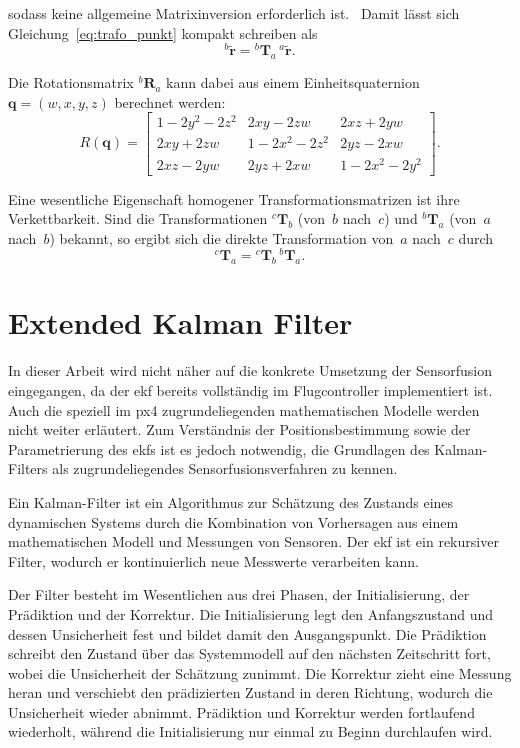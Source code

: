 sodass keine allgemeine Matrixinversion erforderlich ist.~\cite{Lynch2017}
Damit lässt sich Gleichung~\ref{eq:trafo_punkt} kompakt schreiben als
\begin{equation}
^b\tilde{\mathbf{r}} = {^b\mathbf{T}_a}\,{^a\tilde{\mathbf{r}}}.
\label{eq:trafo_homogen}
\end{equation}

Die Rotationsmatrix $^b\mathbf{R}_a$ kann dabei aus einem Einheitsquaternion $\mathbf{q} = (w, x, y, z)$ berechnet werden:
\begin{equation}
R(\mathbf{q}) = 
\begin{bmatrix}
1 - 2y^2 - 2z^2 & 2xy - 2zw & 2xz + 2yw \\
2xy + 2zw & 1 - 2x^2 - 2z^2 & 2yz - 2xw \\
2xz - 2yw & 2yz + 2xw & 1 - 2x^2 - 2y^2
\end{bmatrix}.
\label{eq:rotationsmatrix_quaternion}
\end{equation}

Eine wesentliche Eigenschaft homogener Transformationsmatrizen ist ihre Verkettbarkeit.
Sind die Transformationen $^c\mathbf{T}_b$ (von~$b$ nach~$c$) und $^b\mathbf{T}_a$ (von~$a$ nach~$b$) bekannt, so ergibt sich die direkte Transformation von~$a$ nach~$c$ durch
\begin{equation}
^c\mathbf{T}_a = {^c\mathbf{T}_b}\,{^b\mathbf{T}_a}.
\label{eq:trafo_verkettung}
\end{equation}

\section{Extended Kalman Filter}
\label{sec:ekf}
In dieser Arbeit wird nicht näher auf die konkrete Umsetzung der Sensorfusion eingegangen, da der \gls{ekf} bereits vollständig im Flugcontroller implementiert ist.
Auch die speziell im \gls{px4} zugrundeliegenden mathematischen Modelle werden nicht weiter erläutert.
Zum Verständnis der Positionsbestimmung sowie der Parametrierung des \gls{ekf}s ist es jedoch notwendig, die Grundlagen des Kalman-Filters als zugrundeliegendes Sensorfusionsverfahren zu kennen.

Ein Kalman-Filter ist ein Algorithmus zur Schätzung des Zustands eines dynamischen Systems durch 
die Kombination von Vorhersagen aus einem mathematischen Modell und Messungen von Sensoren.
Der \gls{ekf} ist ein rekursiver Filter, wodurch er kontinuierlich neue Messwerte verarbeiten kann.~\cite{kalman1960}

Der Filter besteht im Wesentlichen aus drei Phasen, der Initialisierung, der Prädiktion und der Korrektur.
Die Initialisierung legt den Anfangszustand und dessen Unsicherheit fest und bildet damit den Ausgangspunkt.
Die Prädiktion schreibt den Zustand über das Systemmodell auf den nächsten Zeitschritt fort, wobei die Unsicherheit der Schätzung zunimmt.
Die Korrektur zieht eine Messung heran und verschiebt den prädizierten Zustand in deren Richtung, wodurch die Unsicherheit wieder abnimmt.
Prädiktion und Korrektur werden fortlaufend wiederholt, während die Initialisierung nur einmal zu Beginn durchlaufen wird.~\cite{Bang18}

